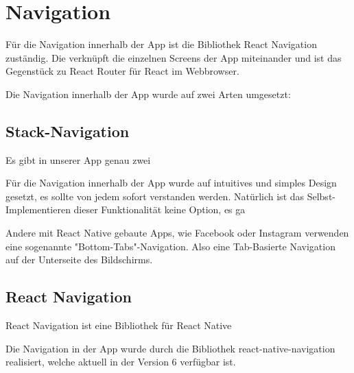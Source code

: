 \chapter{Navigation}
Für die Navigation innerhalb der App ist die Bibliothek React Navigation zuständig. Die verknüpft
die einzelnen Screens der App miteinander und ist das Gegenstück zu React Router für React im
Webbrowser.

Die Navigation innerhalb der App wurde auf zwei Arten umgesetzt:

\section{Stack-Navigation}
Es gibt in unserer App genau zwei 


Für die Navigation innerhalb der App wurde auf intuitives und simples Design gesetzt, es sollte von
jedem sofort verstanden werden. Natürlich ist das Selbst-Implementieren dieser Funktionalität keine
Option, es ga


Andere mit React Native gebaute Apps, wie Facebook oder Instagram
verwenden eine sogenannte "Bottom-Tabs"-Navigation. Also eine Tab-Basierte Navigation auf der
Unterseite des Bildschirms.

\section{React Navigation}
React Navigation ist eine Bibliothek für React Native


Die Navigation in der App wurde durch die Bibliothek react-native-navigation realisiert, welche
aktuell in der Version 6 verfügbar ist.